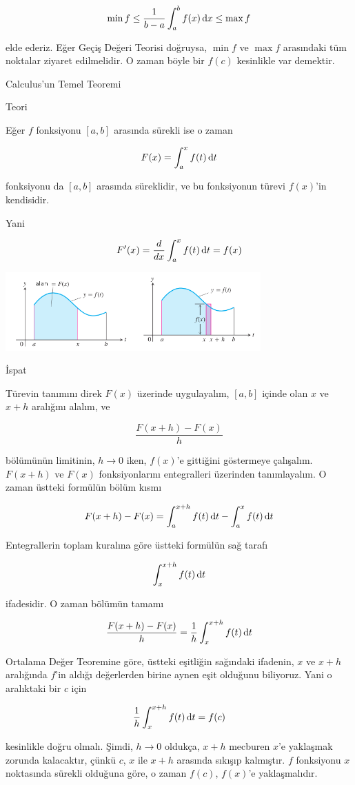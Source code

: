 \documentclass[12pt,fleqn]{article}\usepackage{../../common}
\begin{document}
$$ \min f  \le \frac{1}{b-a} \int_a^b f(x) \,\mathrm{d} x \le \max f  $$

elde ederiz. Eğer Geçiş Değeri Teorisi doğruysa, $\min f$ ve $\max f$
arasındaki tüm noktalar ziyaret edilmelidir. O zaman böyle bir $f(c)$
kesinlikle var demektir.

Calculus'un Temel Teoremi

Teori

Eğer $f$ fonksiyonu $[a,b]$ arasında sürekli ise o zaman 

$$ F(x) = \int_a^x f(t) \,\mathrm{d} t  $$

fonksiyonu da $[a,b]$ arasında süreklidir, ve bu fonksiyonun türevi
$f(x)$'in kendisidir.

Yani

$$ F'(x) = \frac{d}{dx}\int_a^x f(t) \,\mathrm{d} t = f(x)   $$

\includegraphics[height=3cm]{calc_multi_app_03.png}

İspat

Türevin tanımını direk $F(x)$ üzerinde uygulayalım, $[a,b]$ içinde olan $x$
ve $x+h$ aralığını alalım, ve

$$ \frac{F(x+h)-F(x)}{h} $$

bölümünün limitinin, $h \to 0$ iken, $f(x)$'e gittiğini göstermeye
çalışalım. $F(x+h)$ ve $F(x)$ fonksiyonlarını entegralleri üzerinden
tanımlayalım. O zaman üstteki formülün bölüm kısmı

$$ F(x+h) - F(x) = \int_a^{x+h} f(t) \,\mathrm{d} t - \int_a^x f(t) \,\mathrm{d} t  $$

Entegrallerin toplam kuralına göre üstteki formülün sağ tarafı 

$$ \int_x^{x+h} f(t) \,\mathrm{d} t  $$

ifadesidir. O zaman bölümün tamamı

$$ \frac{F(x+h)-F(x)}{h} = \frac{1}{h} \int_x^{x+h} f(t) \,\mathrm{d} t   $$

Ortalama Değer Teoremine göre, üstteki eşitliğin sağındaki ifadenin, $x$ ve
$x+h$ aralığında $f$'in aldığı değerlerden birine aynen eşit olduğunu
biliyoruz. Yani o aralıktaki bir $c$ için

$$ \frac{1}{h} \int_x^{x+h} f(t) \,\mathrm{d} t = f(c) $$

kesinlikle doğru olmalı. Şimdi, $h \to 0$ oldukça, $x+h$ mecburen $x$'e
yaklaşmak zorunda kalacaktır, çünkü $c$, $x$ ile $x+h$ arasında sıkışıp
kalmıştır. $f$ fonksiyonu $x$ noktasında sürekli olduğuna göre, o zaman
$f(c)$, $f(x)$'e yaklaşmalıdır. 
\end{document}
